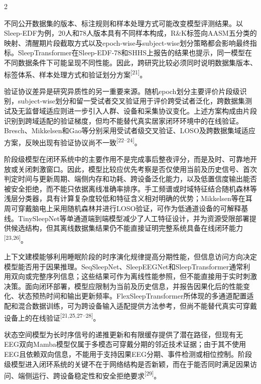 \documentclass[UTF8,zihao=5,fontset=none]{ctexart}
\newcommand{\song}{\CJKfamily{song}}
\newcommand{\levelthree}[1]{%
  \par\noindent{\song\fontsize{10.5pt}{12.6pt}\selectfont #1}}
\newcommand{\refcite}[1]{\nolinebreak[4]\textsuperscript{[#1]}}
\begin{document}
\begin{multicols}{2}

不同公开数据集的版本、标注规则和样本处理方式可能改变模型评测结果。以Sleep-EDF为例，20人和78人版本具有不同样本构成，R\&K标签向AASM五分类的映射、清醒期片段截取方式以及epoch-wise与subject-wise划分策略都会影响最终指标。SleepTransformer在Sleep-EDF-78和SHHS上报告的结果也提示，同一模型在不同数据条件下可能呈现不同性能。因此，跨研究比较必须同时说明数据集版本、标签体系、样本处理方式和验证划分方案\refcite{21}。\par

验证协议差异是研究异质性的另一重要来源。随机epoch划分主要评价片段级识别，subject-wise划分和留一受试者交叉验证用于评价跨受试者泛化，跨数据集测试及无监督域适应则进一步引入人群、设备和采集协议变化。上述方案构成由片段识别到跨域适配的验证梯度，但均不能替代真实居家闭环环境中的在线验证。Bresch、Mikkelsen和Gao等分别采用受试者级交叉验证、LOSO及跨数据集域适应方案，反映出现有验证协议尚不一致\refcite{22--24}。\par

\levelthree{2.2.3 阶段级表征与上下文模型}
阶段级模型在闭环系统中的主要作用不是完成事后整夜评分，而是及时、可靠地开放或关闭刺激窗口。因此，模型比较应优先考察是否仅使用当前及历史信号、首次判定时间与更新周期、端侧内存和功耗、跨设备泛化能力，以及低置信度输出能否被安全拒绝，而不能只依据离线准确率排序。手工频谱或时域特征结合随机森林等浅层分类器，具有计算复杂度较低和特征含义相对明确的优势；Mikkelsen等在耳周可穿戴脑电上采用随机森林并进行LOSO验证，可作为低通道设备的可解释基线。TinySleepNet等单通道端到端模型减少了人工特征设计，并为资源受限部署提供候选结构，但其离线数据集结果仍不能直接证明完整系统具备在线闭环能力\refcite{23,26}。\par

上下文建模能够利用睡眠阶段的时序演化规律提高分期性能，但信息访问方向决定模型能否用于因果推理。SeqSleepNet、SleepEEGNet和SleepTransformer通常利用双向或完整序列信息；这些结果可作为离线性能参照，但不能直接用于实时刺激决策。面向闭环部署，模型应限制为当前及历史信息，并报告因果化后的性能变化、状态预热时间和输出更新频率。FlexSleepTransformer所体现的多通道配置适配和混合数据训练，可为跨设备输入适配提供方法参考，但尚不能替代真实可穿戴设备上的在线验证\refcite{21,25,27--28}。\par

状态空间模型为长时序信号的递推更新和有限缓存提供了潜在路径，但现有无EEG双向Mamba模型仅属于多模态可穿戴分期的邻近技术证据；由于其不使用EEG且依赖双向信息，不能用于支持因果EEG分期、事件检测或相位控制。阶段级模型进入闭环系统的关键不在于网络结构是否新颖，而在于能否同时满足因果访问、端侧运行、跨设备稳定性和安全拒绝要求\refcite{29}。\par


\end{multicols}
\end{document}

